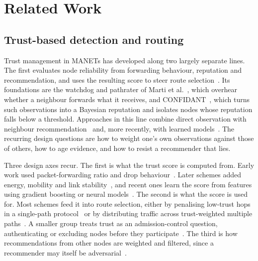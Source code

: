 \section{Related Work}
\label{sec:related}

\subsection{Trust-based detection and routing}

Trust management in MANETs has developed along two largely separate lines.
The first evaluates node reliability from forwarding behaviour, reputation
and recommendation, and uses the resulting score to steer route
selection~\cite{cai2019evolutionary,xia2013trust,sirajuddin2021tbsmr,singh2020self}.
Its foundations are the watchdog and pathrater of Marti
et al.~\cite{marti2000mitigating}, which overhear whether a neighbour forwards
what it receives, and CONFIDANT~\cite{buchegger2002confidant}, which turns
such observations into a Bayesian reputation and isolates nodes whose
reputation falls below a threshold.
Approaches in this line combine direct observation with neighbour
recommendation~\cite{singh2020self,sanchez2015model} and, more recently,
with learned models~\cite{dhand2025secure,mahamune2024trust}. The recurring
design questions are how to weight one's own observations against those of
others, how to age evidence, and how to resist a recommender that lies.

Three design axes recur. The first is what the trust score is computed
from. Early work used packet-forwarding ratio and drop
behaviour~\cite{xia2013trust,sanchez2015model}. Later schemes added energy,
mobility and link stability~\cite{veeraiah2021trust,thirunavukkarasu2022cluster},
and recent ones learn the score from features using gradient boosting or
neural models~\cite{ryu2023reputation,dhand2025secure}. The second is what
the score is used for. Most schemes feed it into route selection, either by
penalising low-trust hops in a single-path
protocol~\cite{pathan2018efficient,pari2023enhanced} or by distributing
traffic across trust-weighted multiple
paths~\cite{sirajuddin2021tbsmr,srilakshmi2021improved,srilakshmi2022secure}.
A smaller group treats trust as an admission-control question,
authenticating or excluding nodes before they
participate~\cite{tu2021active,lwin2020blockchain}. The third is how
recommendations from other nodes are weighted and filtered, since a
recommender may itself be
adversarial~\cite{singh2020self,rajeswari2021efficient,pari2023hybrid}.

